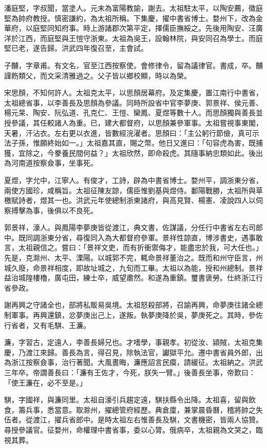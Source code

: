\begin{pinyinscope}
潘庭堅，字叔聞，當塗人。元末為富陽教諭，謝去。太祖駐太平，以陶安薦，徵庭堅為帥府教授。慎密謙約，為太祖所稱。下集慶，擢中書省博士。婺州下，改為金華府，以庭堅同知府事。時上游諸郡次第平定，擇儒臣撫綏之。先後用陶安、汪廣洋於江西，而庭堅與王愷守浙東。太祖為吳王，設翰林院，與安同召為學士。而庭堅已老，遂告歸。洪武四年復召至，主會試。

子黼，字章甫。有文名，官至江西按察使。會修律令，留為議律官。書成，卒。黼謹飭類父，而文采清雅過之。父子皆以鄉校顯，時以為榮。

宋思顏，不知何許人。太祖克太平，以思顏居幕府。及定集慶，置江南行中書省，太祖總省事，以李善長及思顏為參議。同時所設省中官李夢庚、郭景祥、侯元善、楊元杲、陶安、阮弘道、孔克仁、王愷、欒鳳、夏煜等數十人。而思顏獨與善長並授參議，其任較諸人為重。已，建大都督府，以思顏兼參軍事。太祖嘗視事東閣，天暑，汗沾衣。左右更以衣進，皆數經浣濯者。思顏曰：「主公躬行節儉，真可示法子孫，惟願終始如一。」太祖嘉其直，賜之幣。他日又進曰：「句容虎為害，既捕獲，宜除之，今豢養民間何益？」太祖欣然，即命殺虎。其隨事納忠類如此。後出為河南道按察僉事，坐事死。

夏煜，字允中，江寧人。有俊才，工詩，辟為中書省博士。婺州平，調浙東分省，兩使方國珍，咸稱旨。太祖征陳友諒，儒臣惟劉基與煜侍。鄱陽戰勝，太祖所與草檄賦詩者，煜其一也。洪武元年使總制浙東諸府，與高見賢、楊憲、凌說四人以伺察搏擊為事，後俱以不良死。

郭景祥，濠人。與鳳陽李夢庚皆從渡江，典文書，佐謀議，分任行中書省左右司郎中。既同調浙東分省，尋復同入為大都督府參軍。景祥性諒直，博涉書史，遇事敢言，太祖親信之。嘗曰：「景祥文吏，而有折衝禦侮才，能盡忠於我，可大任也。」先是，克滁州、太平、溧陽。以城郭不完，輒命景祥董治之。既而和州守臣言，州城久廢，命景祥相度，即故址城之，九旬而工畢。太祖以為能，授和州總制。景祥益治城隍樓櫓，廣屯田，練士卒，威望肅然。和遂為重鎮。璽書褒勞。仕終浙江行省參政。

謝再興之守諸全也，部將私販易吳境。太祖怒殺部將，召諭再興，命夢庚往諸全總制軍事。再興還鎮，忿夢庚出己上，遂叛。執夢庚降於吳，夢庚死之。其時，參佐行省者，又有毛騏、王濂。

濂，字習古，定遠人，李善長婦兄也。才嗜學，事親孝。初從汝、潁賊，太祖克集慶，乃渡江來歸。善長為言，得召見，除執法官，讞獄平允。遷中書省員外郎，出為浙江按察僉事，治行著聞。大風晝晦，濂應詔言民瘼，請緩征。太祖納之。洪武三年卒。帝謂善長曰：「濂有王佐才，今死，朕失一臂。」後善長坐事，帝歎曰：「使王濂在，必不至是。」

騏，字國祥，與濂同里。太祖自濠引兵趨定遠，騏扶縣令出降。太祖喜，留與飲食，籌兵事，悉當意。取滁州，擢總管府經歷。典倉廩，兼掌晨昏曆，稽將帥之失伍者。從渡江，擢兵省郎中。是時太祖左右惟善長及騏，文書機密，皆兩人協贊。尋授參議官。征婺州，命權理中書省事，委以心膂。俄病卒，太祖親為文哭之，臨視其葬。


\end{pinyinscope}
